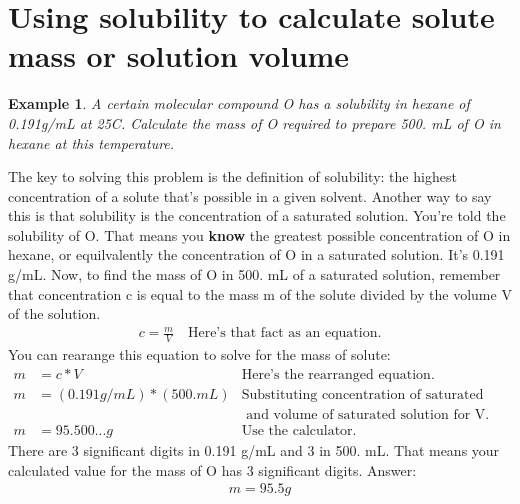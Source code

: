 \documentclass{article}  %
\newtheorem{exmp}{Example}
\begin{document}
\section*{Using solubility to calculate solute mass or solution volume}
\begin{exmp}
    A certain molecular compound O has a solubility in hexane of 0.191g/mL at 25C. Calculate the mass of O required to prepare 500. mL of O in hexane at this temperature.
\end{exmp}
The key to solving this problem is the definition of solubility: the highest concentration of a solute that's possible in a given solvent. Another way to say this is that solubility is the concentration of a saturated solution. 
\newline
You're told the solubility of O. That means you \textbf{know} the greatest possible concentration of O in hexane, or equilvalently the concentration of O in a saturated solution. It's 0.191 g/mL.
\newline
Now, to find the mass of O in 500. mL of a saturated solution, remember that concentration c is equal to the mass m of the solute divided by the volume V of the solution.
\begin{equation*}
    \begin{aligned}
        c = \frac{m}{V} \quad \text{Here's that fact as an equation.}
    \end{aligned}
\end{equation*}
You can rearange this equation to solve for the mass of solute:
\begin{equation*}
    \begin{aligned}
        m &= c * V &\text{Here's the rearranged equation.}\\
        m &= (0.191g/mL) * (500.mL) &\text{Substituting concentration of saturated solution for c,} \\
        &&\text{ and volume of saturated solution for V.} \\
        m &= 95.500... g &\text{Use the calculator.}
    \end{aligned}
\end{equation*}
There are 3 significant digits in 0.191 g/mL and 3 in 500. mL. That means your calculated value for the mass of O has 3 significant digits.
\newline
Answer:
\begin{equation*}
    \begin{aligned}
        m = 95.5g
    \end{aligned}
\end{equation*}
\end{document}
